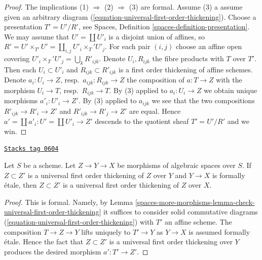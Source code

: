 \begin{proof}
The implications (1) $\Rightarrow$ (2) $\Rightarrow$ (3) are formal.
Assume (3) a assume given an arbitrary diagram
(\ref{equation-universal-first-order-thickening}).
Choose a presentation $T' = U'/R'$, see
Spaces, Definition \ref{spaces-definition-presentation}.
We may assume that $U' = \coprod U'_i$ is a disjoint union
of affines, so $R' = U' \times_{T'} U' = \coprod_{i, j} U'_i \times_T' U'_j$.
For each pair $(i, j)$ choose an affine open covering
$U'_i \times_T' U'_j = \bigcup_k R'_{ijk}$. Denote $U_i, R_{ijk}$
the fibre products with $T$ over $T'$. Then each
$U_i \subset U'_i$ and $R_{ijk} \subset R'_{ijk}$
is a first order thickening of affine schemes.
Denote $a_i : U_i \to Z$, resp.\ $a_{ijk} : R_{ijk} \to Z$
the composition of $a : T \to Z$ with the morphism
$U_i \to T$, resp.\ $R_{ijk} \to T$.
By (3) applied to $a_i : U_i \to Z$
we obtain unique morphisms $a'_i : U'_i \to Z'$.
By (3) applied to $a_{ijk}$ we see that the two compositions
$R'_{ijk} \to R'_i \to Z'$ and $R'_{ijk} \to R'_j \to Z'$
are equal. Hence $a' = \coprod a'_i : U' = \coprod U'_i \to Z'$
descends to the quotient sheaf $T' = U'/R'$ and we win.
\end{proof}

\begin{lemma}
\label{spaces-more-morphisms-lemma-universal-thickening-over-formally-etale}
\href{https://stacks.math.columbia.edu/tag/0604}{\texttt{Stacks tag 0604}}

Let $S$ be a scheme.
Let $Z \to Y \to X$ be morphisms of algebraic spaces over $S$.
If $Z \subset Z'$ is a universal first order thickening of
$Z$ over $Y$ and $Y \to X$ is formally \'etale, then $Z \subset Z'$ is
a universal first order thickening of $Z$ over $X$.
\end{lemma}

\begin{proof}
This is formal. Namely, by
Lemma \ref{spaces-more-morphisms-lemma-check-universal-first-order-thickening}
it suffices to consider solid commutative diagrams
(\ref{equation-universal-first-order-thickening})
with $T'$ an affine scheme. The composition
$T \to Z \to Y$ lifts uniquely to $T' \to Y$ as $Y \to X$ is
assumed formally \'etale. Hence the fact that
$Z \subset Z'$ is a universal first order thickening over $Y$
produces the desired morphism $a' : T' \to Z'$.
\end{proof}

